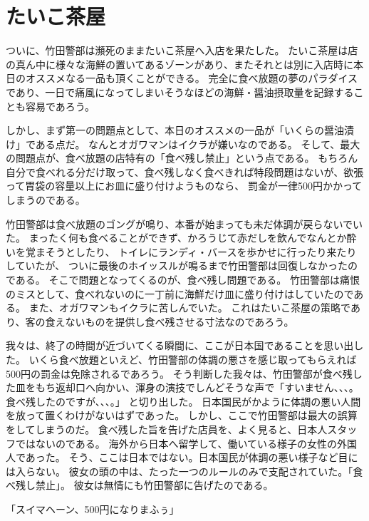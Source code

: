 \section{たいこ茶屋}
ついに、竹田警部は瀕死のままたいこ茶屋へ入店を果たした。
たいこ茶屋は店の真ん中に様々な海鮮の置いてあるゾーンがあり、またそれとは別に入店時に本日のオススメなる一品も頂くことができる。
完全に食べ放題の夢のパラダイスであり、一日で痛風になってしまいそうなほどの海鮮・醤油摂取量を記録することも容易であろう。
\par
しかし、まず第一の問題点として、本日のオススメの一品が「いくらの醤油漬け」である点だ。
なんとオガワマンはイクラが嫌いなのである。
そして、最大の問題点が、食べ放題の店特有の「食べ残し禁止」という点である。
もちろん自分で食べれる分だけ取って、食べ残しなく食べきれば特段問題はないが、欲張って胃袋の容量以上にお皿に盛り付けようものなら、
罰金が一律500円かかってしまうのである。
\par
竹田警部は食べ放題のゴングが鳴り、本番が始まっても未だ体調が戻らないでいた。
まったく何も食べることができず、かろうじて赤だしを飲んでなんとか酔いを覚まそうとしたり、 トイレにランディ・バースを歩かせに行ったり来たりしていたが、
ついに最後のホイッスルが鳴るまで竹田警部は回復しなかったのである。
そこで問題となってくるのが、食べ残し問題である。
竹田警部は痛恨のミスとして、食べれないのに一丁前に海鮮だけ皿に盛り付けはしていたのである。
また、オガワマンもイクラに苦しんでいた。
これはたいこ茶屋の策略であり、客の食えないものを提供し食べ残させる寸法なのであろう。
\par
我々は、終了の時間が近づいてくる瞬間に、ここが日本国であることを思い出した。
いくら食べ放題といえど、竹田警部の体調の悪さを感じ取ってもらえれば500円の罰金は免除されるであろう。
そう判断した我々は、竹田警部が食べ残した皿をもち返却口へ向かい、渾身の演技でしんどそうな声で「すいません、、、。食べ残したのですが、、、。」
と切り出した。
日本国民がかように体調の悪い人間を放って置くわけがないはずであった。
しかし、ここで竹田警部は最大の誤算をしてしまうのだ。
食べ残した旨を告げた店員を、よく見ると、日本人スタッフではないのである。
海外から日本へ留学して、働いている様子の女性の外国人であった。
そう、ここは日本ではない。日本国民が体調の悪い様子など目には入らない。
彼女の頭の中は、たった一つのルールのみで支配されていた。「食べ残し禁止」。
彼女は無情にも竹田警部に告げたのである。
\begin{center}
「スイマヘーン、500円になりまふぅ」
\end{center}

